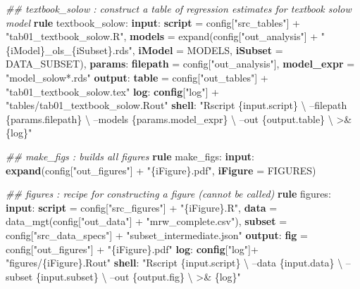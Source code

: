 \documentclass[]{book}
\newenvironment{Shaded}{\begin{snugshade}}{\end{snugshade}}
\newcommand{\KeywordTok}[1]{\textcolor[rgb]{0.13,0.29,0.53}{\textbf{{#1}}}}
\newcommand{\StringTok}[1]{\textcolor[rgb]{0.31,0.60,0.02}{{#1}}}
\newcommand{\CommentTok}[1]{\textcolor[rgb]{0.56,0.35,0.01}{\textit{{#1}}}}
\newcommand{\NormalTok}[1]{{#1}}
\theoremstyle{definition}
\theoremstyle{definition}
\theoremstyle{definition}
\theoremstyle{remark}
\begin{document}
\begin{Shaded}
\begin{Highlighting}[]
\CommentTok{## textbook_solow     : construct a table of regression estimates for textbook solow model}
\KeywordTok{rule} \NormalTok{textbook_solow:}
    \KeywordTok{input}\NormalTok{:}
        \KeywordTok{script} \NormalTok{= config[}\StringTok{"src_tables"}\NormalTok{] + }\StringTok{"tab01_textbook_solow.R"}\NormalTok{,}
        \KeywordTok{models} \NormalTok{= expand(config[}\StringTok{"out_analysis"}\NormalTok{] + }\StringTok{"\{iModel\}_ols_\{iSubset\}.rds"}\NormalTok{,}
                            \KeywordTok{iModel} \NormalTok{= MODELS,}
                            \KeywordTok{iSubset} \NormalTok{= DATA_SUBSET),}
    \KeywordTok{params}\NormalTok{:}
        \KeywordTok{filepath}   \NormalTok{= config[}\StringTok{"out_analysis"}\NormalTok{],}
        \KeywordTok{model_expr} \NormalTok{= }\StringTok{"model_solow*.rds"}
    \KeywordTok{output}\NormalTok{:}
        \KeywordTok{table} \NormalTok{= config[}\StringTok{"out_tables"}\NormalTok{] + }\StringTok{"tab01_textbook_solow.tex"}
    \KeywordTok{log}\NormalTok{:}
        \KeywordTok{config}\NormalTok{[}\StringTok{"log"}\NormalTok{] + }\StringTok{"tables/tab01_textbook_solow.Rout"}
    \KeywordTok{shell}\NormalTok{:}
        \StringTok{"Rscript \{input.script\} \textbackslash{}}
\StringTok{            --filepath \{params.filepath\} \textbackslash{}}
\StringTok{            --models \{params.model_expr\} \textbackslash{}}
\StringTok{            --out \{output.table\} \textbackslash{}}
\StringTok{            >& \{log\}"}

\CommentTok{## make_figs          : builds all figures}
\KeywordTok{rule} \NormalTok{make_figs:}
    \KeywordTok{input}\NormalTok{:}
        \KeywordTok{expand}\NormalTok{(config[}\StringTok{"out_figures"}\NormalTok{] + }\StringTok{"\{iFigure\}.pdf"}\NormalTok{,}
                \KeywordTok{iFigure} \NormalTok{= FIGURES)}

\CommentTok{## figures            : recipe for constructing a figure (cannot be called)}
\KeywordTok{rule} \NormalTok{figures:}
    \KeywordTok{input}\NormalTok{:}
        \KeywordTok{script} \NormalTok{= config[}\StringTok{"src_figures"}\NormalTok{] + }\StringTok{"\{iFigure\}.R"}\NormalTok{,}
        \KeywordTok{data}   \NormalTok{= data_mgt(config[}\StringTok{"out_data"}\NormalTok{] + }\StringTok{"mrw_complete.csv"}\NormalTok{),}
        \KeywordTok{subset} \NormalTok{= config[}\StringTok{"src_data_specs"}\NormalTok{] + }\StringTok{"subset_intermediate.json"}
    \KeywordTok{output}\NormalTok{:}
        \KeywordTok{fig} \NormalTok{= config[}\StringTok{"out_figures"}\NormalTok{] + }\StringTok{"\{iFigure\}.pdf"}
    \KeywordTok{log}\NormalTok{:}
        \KeywordTok{config}\NormalTok{[}\StringTok{"log"}\NormalTok{]+ }\StringTok{"figures/\{iFigure\}.Rout"}
    \KeywordTok{shell}\NormalTok{:}
        \StringTok{"Rscript \{input.script\} \textbackslash{}}
\StringTok{            --data \{input.data\} \textbackslash{}}
\StringTok{            --subset \{input.subset\} \textbackslash{}}
\StringTok{            --out \{output.fig\} \textbackslash{}}
\StringTok{            >& \{log\}"}


\end{Highlighting}
\end{Shaded}
\end{document}

